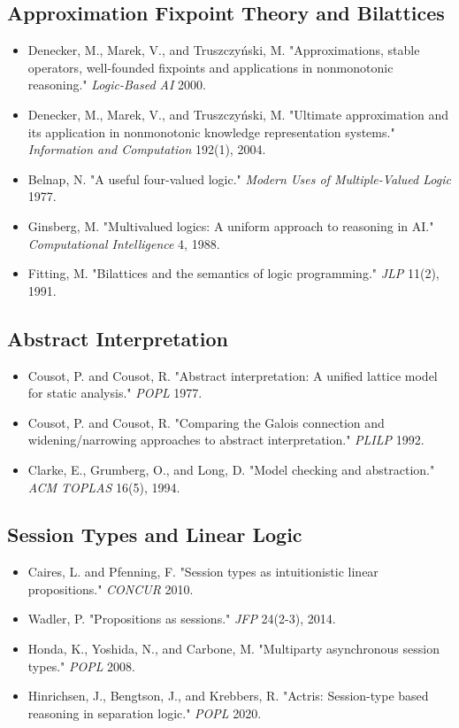 \documentclass[11pt]{article}
\begin{document}
\subsection{Approximation Fixpoint Theory and Bilattices}
\label{sec:orgd380b49}
\begin{itemize}
\item Denecker, M., Marek, V., and Truszczyński, M. "Approximations, stable operators, well-founded fixpoints and applications in nonmonotonic reasoning." \emph{Logic-Based AI} 2000.
\item Denecker, M., Marek, V., and Truszczyński, M. "Ultimate approximation and its application in nonmonotonic knowledge representation systems." \emph{Information and Computation} 192(1), 2004.
\item Belnap, N. "A useful four-valued logic." \emph{Modern Uses of Multiple-Valued Logic} 1977.
\item Ginsberg, M. "Multivalued logics: A uniform approach to reasoning in AI." \emph{Computational Intelligence} 4, 1988.
\item Fitting, M. "Bilattices and the semantics of logic programming." \emph{JLP} 11(2), 1991.
\end{itemize}
\subsection{Abstract Interpretation}
\label{sec:orgcff7f58}
\begin{itemize}
\item Cousot, P. and Cousot, R. "Abstract interpretation: A unified lattice model for static analysis." \emph{POPL} 1977.
\item Cousot, P. and Cousot, R. "Comparing the Galois connection and widening/narrowing approaches to abstract interpretation." \emph{PLILP} 1992.
\item Clarke, E., Grumberg, O., and Long, D. "Model checking and abstraction." \emph{ACM TOPLAS} 16(5), 1994.
\end{itemize}
\subsection{Session Types and Linear Logic}
\label{sec:org768b3d7}
\begin{itemize}
\item Caires, L. and Pfenning, F. "Session types as intuitionistic linear propositions." \emph{CONCUR} 2010.
\item Wadler, P. "Propositions as sessions." \emph{JFP} 24(2-3), 2014.
\item Honda, K., Yoshida, N., and Carbone, M. "Multiparty asynchronous session types." \emph{POPL} 2008.
\item Hinrichsen, J., Bengtson, J., and Krebbers, R. "Actris: Session-type based reasoning in separation logic." \emph{POPL} 2020.
\end{itemize}
\end{document}
